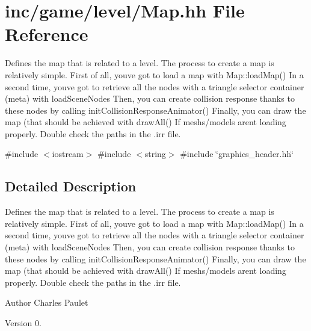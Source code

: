 \hypertarget{Map_8hh}{}\section{inc/game/level/\+Map.hh File Reference}
\label{Map_8hh}


Defines the map that is related to a level. The process to create a map is relatively simple. First of all, you\textquotesingle{}ve got to load a map with Map\+::load\+Map() In a second time, you\textquotesingle{}ve got to retrieve all the nodes with a triangle selector container (meta) with load\+Scene\+Nodes Then, you can create collision response thanks to these nodes by calling init\+Collision\+Response\+Animator() Finally, you can draw the map (that should be achieved with draw\+All()  If meshs/models arent loading properly. Double check the paths in the .irr file.  


{\ttfamily \#include $<$iostream$>$}\newline
{\ttfamily \#include $<$string$>$}\newline
{\ttfamily \#include \char`\"{}graphics\+\_\+header.\+hh\char`\"{}}\newline


\subsection{Detailed Description}
Defines the map that is related to a level. The process to create a map is relatively simple. First of all, you\textquotesingle{}ve got to load a map with Map\+::load\+Map() In a second time, you\textquotesingle{}ve got to retrieve all the nodes with a triangle selector container (meta) with load\+Scene\+Nodes Then, you can create collision response thanks to these nodes by calling init\+Collision\+Response\+Animator() Finally, you can draw the map (that should be achieved with draw\+All()  If meshs/models arent loading properly. Double check the paths in the .irr file. 

\begin{DoxyAuthor}{Author}
Charles Paulet 
\end{DoxyAuthor}
\begin{DoxyVersion}{Version}
0. 
\end{DoxyVersion}
